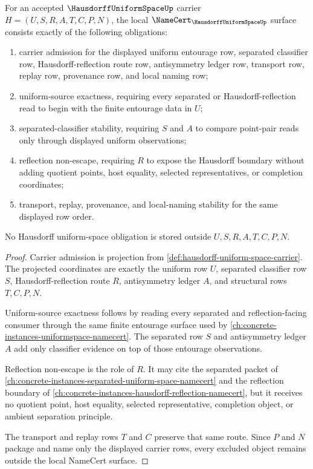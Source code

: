 \begin{theorem}
\label{thm:hausdorff-uniform-space-namecert-obligations}
For an accepted $\HausdorffUniformSpaceUp$ carrier $H=(U,S,R,A,T,C,P,N)$, the local $\NameCert_{\HausdorffUniformSpaceUp}$ surface consists exactly of the following obligations:
\begin{enumerate}
\item carrier admission for the displayed uniform entourage row, separated classifier row, Hausdorff-reflection route row, antisymmetry ledger row, transport row, replay row, provenance row, and local naming row;
\item uniform-source exactness, requiring every separated or Hausdorff-reflection read to begin with the finite entourage data in $U$;
\item separated-classifier stability, requiring $S$ and $A$ to compare point-pair reads only through displayed uniform observations;
\item reflection non-escape, requiring $R$ to expose the Hausdorff boundary without adding quotient points, host equality, selected representatives, or completion coordinates;
\item transport, replay, provenance, and local-naming stability for the same displayed row order.
\end{enumerate}
No Hausdorff uniform-space obligation is stored outside $U,S,R,A,T,C,P,N$.
\end{theorem}
\begin{proof}
Carrier admission is projection from \autoref{def:hausdorff-uniform-space-carrier}. The projected coordinates are exactly the uniform row $U$, separated classifier row $S$, Hausdorff-reflection route $R$, antisymmetry ledger $A$, and structural rows $T,C,P,N$.

Uniform-source exactness follows by reading every separated and reflection-facing consumer through the same finite entourage surface used by \autoref{ch:concrete-instances-uniformspace-namecert}. The separated row $S$ and antisymmetry ledger $A$ add only classifier evidence on top of those entourage observations.

Reflection non-escape is the role of $R$. It may cite the separated packet of \autoref{ch:concrete-instances-separated-uniform-space-namecert} and the reflection boundary of \autoref{ch:concrete-instances-hausdorff-reflection-namecert}, but it receives no quotient point, host equality, selected representative, completion object, or ambient separation principle.

The transport and replay rows $T$ and $C$ preserve that same route. Since $P$ and $N$ package and name only the displayed carrier rows, every excluded object remains outside the local NameCert surface.
\end{proof}

